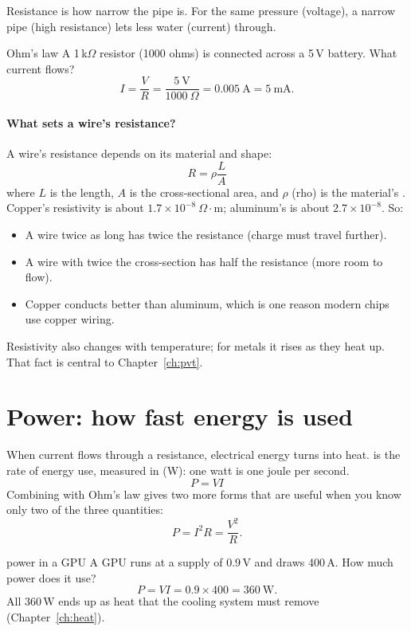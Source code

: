 \begin{everyday}
Resistance is how narrow the pipe is. For the same pressure (voltage), a narrow pipe (high resistance) lets less water (current) through.
\end{everyday}

\begin{worked}{Ohm's law}
A 1\,k$\Omega$ resistor (1000 ohms) is connected across a 5\,V battery. What current flows?
\[
  I = \frac{V}{R} = \frac{5~\text{V}}{1000~\Omega} = 0.005~\text{A} = 5~\text{mA}.
\]
\end{worked}

\paragraph{What sets a wire's resistance?} A wire's resistance depends on its material and shape:
\[
  R = \rho \frac{L}{A}
\]
where $L$ is the length, $A$ is the cross-sectional area, and $\rho$ (rho) is the material's . Copper's resistivity is about $1.7 \times 10^{-8}~\Omega\cdot$m; aluminum's is about $2.7 \times 10^{-8}$. So:
\begin{itemize}
  \item A wire twice as long has twice the resistance (charge must travel further).
  \item A wire with twice the cross-section has half the resistance (more room to flow).
  \item Copper conducts better than aluminum, which is one reason modern chips use copper wiring.
\end{itemize}
Resistivity also changes with temperature; for metals it rises as they heat up. That fact is central to Chapter~\ref{ch:pvt}.

\section{Power: how fast energy is used}

When current flows through a resistance, electrical energy turns into heat.  is the rate of energy use, measured in  (W): one watt is one joule per second.
\[
  \boxed{P = V I}
\]
Combining with Ohm's law gives two more forms that are useful when you know only two of the three quantities:
\[
  P = I^2 R = \frac{V^2}{R}.
\]

\begin{worked}{power in a GPU}
A GPU runs at a supply of 0.9\,V and draws 400\,A. How much power does it use?
\[
  P = V I = 0.9 \times 400 = 360~\text{W}.
\]
All 360\,W ends up as heat that the cooling system must remove (Chapter~\ref{ch:heat}).
\end{worked}

